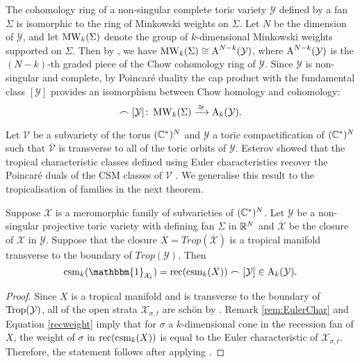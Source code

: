 The cohomology ring of a non-singular complete toric variety $\mathcal{Y}$ defined by a fan $\Sigma$ is isomorphic to the ring of Minkowski weights on $\Sigma$.  Let $N$ be the dimension of $\mathcal{Y}$, and let $\operatorname{MW}_{k}(\Sigma)$ denote the group of $k$-dimensional Minkowski weights supported on $\Sigma$. 
Then by \cite{FultonSturmfels}, we have $ \operatorname{MW}_{k}(\Sigma)\cong \operatorname{A}^{N-k}(\mathcal{Y})$, where $\operatorname{A}^{N-k}(\mathcal{Y})$ is the $(N-k)$-th graded piece of the Chow cohomology  ring of $\mathcal{Y}$. 
Since $\mathcal{Y}$ is non-singular and complete, by Poincar\'e duality the cap product with the fundamental class $[\mathcal{Y}]$ provides an isomorphism between Chow homology and cohomology: 
$$\frown [\mathcal{Y}] \colon \operatorname{MW}_k(\Sigma) \xrightarrow{\,\cong\,} \operatorname{A}_k(\mathcal{Y}).$$
 
Let   $\mathcal{V}$ be a subvariety of the torus $(\mathbb{C}^*)^N$ and $\mathcal{Y}$ a toric compactification of $(\mathbb{C}^*)^N $ such that  $\overline{\mathcal{V}}$ is transverse to all of the toric  orbits of $\mathcal{Y}$.
Esterov showed that the tropical characteristic classes defined using Euler characteristics recover the Poincar\'e duals of the CSM classes of $\mathcal{V}$ \cite[Theorem 2.39]{Esterov}.
We generalise this result to the tropicalisation of families in the next theorem.  
   
\begin{thm}
\label{thm:corrToric}
Suppose $\mathcal{X}$ is a meromorphic family of subvarieties  of $(\mathbb{C}^*)^N$.   Let $\mathcal{Y}$ be a non-singular projective toric variety 
with defining fan $\Sigma$ in $\mathbb{R}^N$ and $\overline{\mathcal{X}}$ be the closure of $\mathcal{X}$ in $\mathcal{Y}$. 
Suppose that  the closure $\overline{X} = Trop(\overline{\mathcal{X}})$ is  a tropical manifold transverse to the boundary of $Trop(\mathcal{Y})$. Then
$$\csm_k( \mathbbm{1}_{\mathcal{X}_t}) = \rec(\csm_{k}(X)) \frown [\mathcal{Y}] 
 \in \Ac_{k}(\mathcal{Y}).$$
\end{thm}


\begin{proof}
Since $X$ is a tropical manifold and is transverse to the boundary of $\operatorname{Trop}(\mathcal{Y})$, all of the open strata  $ \mathcal{X}_{\sigma,t}$ are  sch\"on by \cite[Proposition 7.10]{KatzStapledon}. 
Remark \ref{rem:EulerChar} and  Equation \ref{recweight} imply that for $\sigma$ a $k$-dimensional cone in the recession fan of $X$,  the weight of $\sigma $ in $\operatorname{rec}(\operatorname{csm}_{k}(X))$ is equal to  the Euler characteristic of $ \mathcal{X}_{\sigma,t}$.
 Therefore, the statement follows after applying \cite[Theorem 2.39 (1)]{Esterov}. 
\end{proof}

